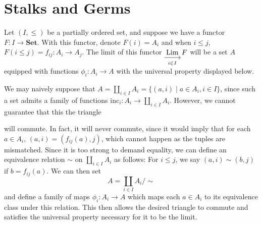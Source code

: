 \section{Stalks and Germs}
Let $(I, \le)$ be a partially ordered set, and suppose we have a functor 
$F: I \to \textbf{Set}$. With this functor, denote $F(i) = A_i$ and 
when $i \le j$, $F(i \le j) = f_{ij}: A_i\to A_j$. 
The limit of this functor $\displaystyle \Limto_{i \in I} F$ will be a set 
$A$ equipped with functions $\phi_i: A_i \to A$ with the universal property displayed below. 
\begin{center}
\end{center}
We may naively suppose that $\displaystyle A = \coprod_{i \in I}A_i = \{(a, i) \mid a \in A_i, i \in I \}$, since such a set 
admits a family of functions $\displaystyle \text{inc}_i: A_i \to \coprod_{i \in I}A_i$. 
However, we cannot guarantee that this the triangle 
\begin{center}
\end{center}
will commute. In fact, it will never commute, since it would imply that 
for each $a \in A_i$, $(a, i) = (f_{ij}(a), j)$, which cannot happen as the 
tuples are mismatched. Since it is too strong to demand equality, we can define 
an equivalence relation $\sim$ on $\displaystyle \coprod_{i \in I}A_i$ 
as follows: For $i \le  j$, we say $(a, i) \sim (b, j)$ if 
$b = f_{ij}(a)$. We can then set 
\[
    A = \coprod_{i \in I}A_i \Big/\sim  
\]
and define a family of maps $\phi_i: A_i \to A$ which maps each $a \in A_i$ to 
its equivalence class under this relation. This then allows the desired triangle 
to commute and satisfies the universal property necessary for it to be the limit. 


